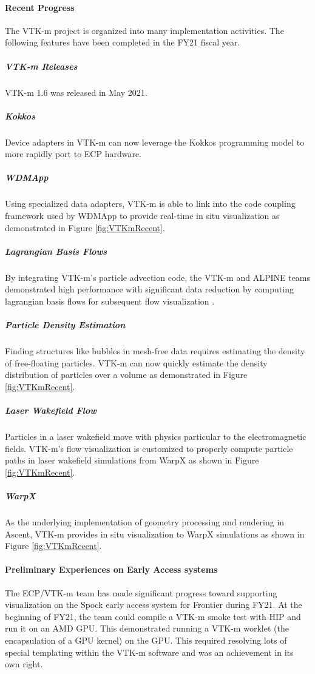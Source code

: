 \paragraph{Recent Progress}
The VTK-m project is organized into many implementation activities.
The following features have been completed in the FY21 fiscal year.

\subparagraph{VTK-m Releases}
  VTK-m 1.6 was released in May 2021.
\subparagraph{Kokkos}
  Device adapters in VTK-m can now leverage the Kokkos programming model to more rapidly port to ECP hardware.
\subparagraph{WDMApp}
  Using specialized data adapters, VTK-m is able to link into the code coupling framework used by WDMApp to provide real-time in situ visualization as demonstrated in Figure \ref{fig:VTKmRecent}.
\subparagraph{Lagrangian Basis Flows}
  By integrating VTK-m's particle advection code, the VTK-m and ALPINE teams demonstrated high performance with significant data reduction by computing lagrangian basis flows for subsequent flow visualization \cite{Sane2021:EGPGV,Sane2021:ICCS}.
\subparagraph{Particle Density Estimation}
  Finding structures like bubbles in mesh-free data requires estimating the density of free-floating particles. VTK-m can now quickly estimate the density distribution of particles over a volume as demonstrated in Figure \ref{fig:VTKmRecent}.
\subparagraph{Laser Wakefield Flow}
  Particles in a laser wakefield move with physics particular to the electromagnetic fields. VTK-m's flow visualization is customized to properly compute particle paths in laser wakefield simulations from WarpX as shown in Figure \ref{fig:VTKmRecent}.
\subparagraph{WarpX}
  As the underlying implementation of geometry processing and rendering in Ascent, VTK-m provides in situ visualization to WarpX simulations as shown in Figure \ref{fig:VTKmRecent}.


\paragraph{Preliminary Experiences on Early Access systems}
The ECP/VTK-m team has made significant progress toward supporting visualization on the Spock early access system for Frontier during FY21.
At the beginning of FY21, the team could compile a VTK-m smoke test with HIP and run it on an AMD GPU.
This demonstrated running a VTK-m worklet (the encapsulation of a GPU kernel) on the GPU.
This required resolving lots of special templating within the VTK-m software and was an achievement in its own right.

